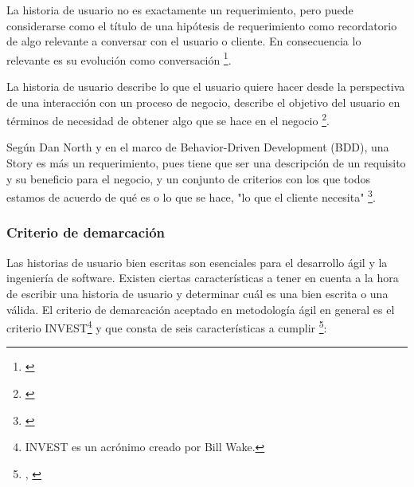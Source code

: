 La historia de usuario no es exactamente un requerimiento, pero puede considerarse como el título de una hipótesis de requerimiento como recordatorio de algo relevante a conversar con el usuario o cliente. En consecuencia lo relevante es su evolución como conversación \footnote{\cite{UNTREF-2014}}.

La historia de usuario describe lo que el usuario quiere hacer desde la perspectiva de una interacción con un proceso de negocio, describe el objetivo del usuario en términos de necesidad de obtener algo que se hace en el negocio \footnote{\cite{Scott-Bellware-2008}}.

Según Dan North y en el marco de Behavior-Driven Development (BDD), una Story es más un requerimiento, pues tiene que ser una descripción de un requisito y su beneficio para el negocio, y un conjunto de criterios con los que todos estamos de acuerdo de qué es o lo que se hace, "lo que el cliente necesita" \footnote{\cite{Dan-North-2015}}. 

\subsubsection{Criterio de demarcación}

Las historias de usuario bien escritas son esenciales para el desarrollo ágil y la ingeniería de software. Existen ciertas características a tener en cuenta a la hora de escribir una historia de usuario y determinar cuál es una bien escrita o una válida. El criterio de demarcación aceptado en metodología ágil en general es el criterio INVEST\footnote{INVEST es un acrónimo creado por Bill Wake.} y que consta de seis características a cumplir \footnote{\cite{UNTREF-2014}, \cite{Scrum-Alliance-2015}}:


